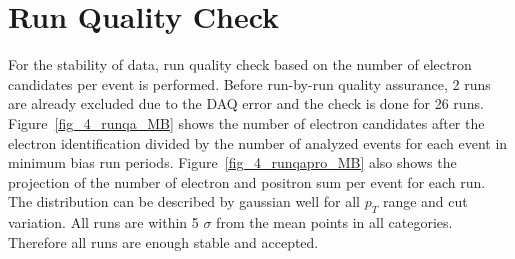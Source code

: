 



\section{Run Quality Check}
\label{sec_4_runselection}
For the stability of data, run quality check based on the number of electron candidates per event is performed. 
Before run-by-run quality assurance, 2 runs are already excluded due to the DAQ error and the check is done for 26 runs. 
Figure~\ref{fig_4_runqa_MB} shows the number of electron candidates after the electron identification divided by the number of analyzed events for each event in minimum bias run periods. 
Figure~\ref{fig_4_runqapro_MB} also shows the projection of the number of electron and positron sum per event for each run. 
The distribution can be described by gaussian well for all $p_{T}$ range and cut variation.
All runs are within 5 $\sigma$ from the mean points in all categories. 
Therefore all runs are enough stable and accepted.  

